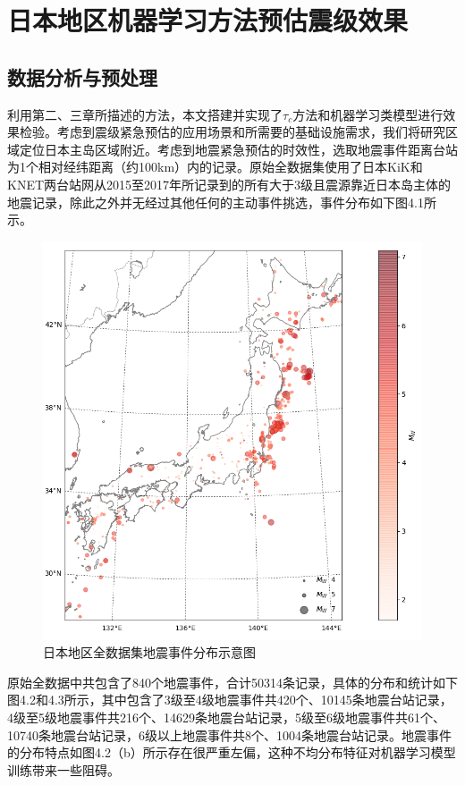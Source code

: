 \chapter{日本地区机器学习方法预估震级效果}
\section{数据分析与预处理}
\indent 利用第二、三章所描述的方法，本文搭建并实现了$\tau_{c}$方法和机器学习类模型进行效果检验。考虑到震级紧急预估的应用场景和所需要的基础设施需求，我们将研究区域定位日本主岛区域附近。考虑到地震紧急预估的时效性，选取地震事件距离台站为1个相对经纬距离（约100km）内的记录。原始全数据集使用了日本KiK和KNET两台站网从2015至2017年所记录到的所有大于3级且震源靠近日本岛主体的地震记录，除此之外并无经过其他任何的主动事件挑选，事件分布如下图4.1所示。\\
\begin{figure}[!h]%
	\centering  %
	\includegraphics[width=\linewidth]{img/basemap.png}  %
	\caption{日本地区全数据集地震事件分布示意图}  %
	\label{fig:mcmthesis-logo}   %
\end{figure}
\indent 原始全数据中共包含了840个地震事件，合计50314条记录，具体的分布和统计如下图4.2和4.3所示，其中包含了3级至4级地震事件共420个、10145条地震台站记录，4级至5级地震事件共216个、14629条地震台站记录，5级至6级地震事件共61个、10740条地震台站记录，6级以上地震事件共8个、1004条地震台站记录。地震事件的分布特点如图4.2（b）所示存在很严重左偏，这种不均分布特征对机器学习模型训练带来一些阻碍。\\
